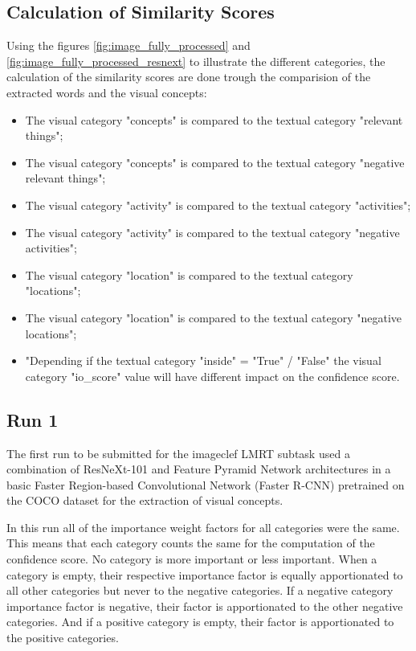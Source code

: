     \subsection{Calculation of Similarity Scores}
    Using the figures \ref{fig:image_fully_processed} and \ref{fig:image_fully_processed_resnext} to illustrate the different categories, the calculation of the similarity scores are done trough the comparision of the extracted words and the visual concepts:
    \begin{itemize}
        \itemsep0em
        \item The visual category "concepts" is compared to the textual category "relevant things";
        \item The visual category "concepts" is compared to the textual category "negative relevant things";
        \item The visual category "activity" is compared to the textual category "activities";
        \item The visual category "activity" is compared to the textual category "negative activities";
        \item The visual category "location" is compared to the textual category "locations";
        \item The visual category "location" is compared to the textual category "negative locations";
        \item "Depending if the textual category "inside" = "True" / "False" the visual category "io\_score" value will have different impact on the confidence score.
    \end{itemize}
    

    \subsection{Run 1}

    The first run to be submitted for the imageclef LMRT subtask used a combination of ResNeXt-101 and Feature Pyramid Network architectures in a basic Faster Region-based Convolutional Network (Faster R-CNN) pretrained on the COCO dataset for the extraction of visual concepts.

    In this run all of the importance weight factors for all categories were the same. This means that each category counts the same for the computation of the confidence score. No category is more important or less important. When a category is empty, their respective importance factor is equally apportionated to all other categories but never to the negative categories. If a negative category importance factor is negative, their factor is apportionated to the other negative categories. And if a positive category is empty, their factor is apportionated to the positive categories.

